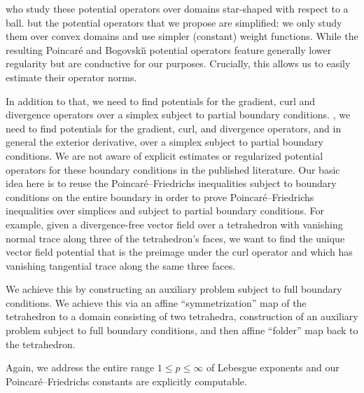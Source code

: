 who study these potential operators over domains star-shaped with respect to a ball. 
but the potential operators that we propose are simplified:
we only study them over convex domains and use simpler (constant) weight functions. 
While the resulting Poincar\'e and Bogovski\u{\i} potential operators feature generally lower regularity but are conductive for our purposes. 
Crucially, this allows us to easily estimate their operator norms. 











In addition to that, we need to find potentials for the gradient, curl and divergence operators over a simplex subject to partial boundary conditions. 
, we  need to find potentials for the gradient, curl, and divergence operators, and in general the exterior derivative, over a simplex subject to partial boundary conditions. 
We are not aware of explicit estimates or regularized potential operators for these boundary conditions in the published literature. 
Our basic idea here is to reuse the Poincar\'e--Friedrichs inequalities subject to boundary conditions on the entire boundary in order to prove Poincar\'e--Friedrichs inequalities over simplices and subject to partial boundary conditions. 
For example, given a divergence-free vector field over a tetrahedron with vanishing normal trace along three of the tetrahedron's faces, 
we want to find the unique vector field potential that is the preimage under the curl operator and which has vanishing tangential trace along the same three faces. 

We achieve this by constructing an auxiliary problem subject to full boundary conditions.
We achieve this via an affine ``symmetrization'' map of the tetrahedron to a domain consisting of two tetrahedra, 
construction of an auxiliary problem subject to full boundary conditions, 
and then affine ``folder'' map back to the tetrahedron.

Again, we address the entire range $1 \leq p \leq \infty$ of Lebesgue exponents and our Poincar\'e--Friedrichs constants are explicitly computable. 


